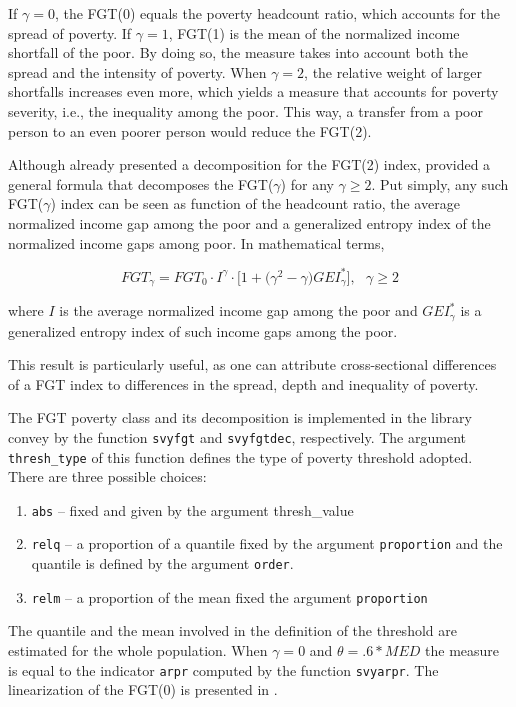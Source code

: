 \documentclass[]{book}
\providecommand{\tightlist}{%
  \setlength{\itemsep}{0pt}\setlength{\parskip}{0pt}}
\begin{document}
If \(\gamma =0\), the FGT(0) equals the poverty headcount ratio, which accounts for the spread of poverty. If \(\gamma =1\), FGT(1) is the mean of the normalized income shortfall of the poor. By doing so, the measure takes into account both the spread and the intensity of poverty. When \(\gamma =2\), the relative weight of larger shortfalls increases even more, which yields a measure that accounts for poverty severity, i.e., the inequality among the poor. This way, a transfer from a poor person to an even poorer person would reduce the FGT(2).

Although \citet{foster1984} already presented a decomposition for the FGT(2) index, \citet{aristondo2010} provided a general formula that decomposes the FGT(\(\gamma\)) for any \(\gamma \geqslant 2\). Put simply, any such FGT(\(\gamma\)) index can be seen as function of the headcount ratio, the average normalized income gap among the poor and a generalized entropy index of the normalized income gaps among poor. In mathematical terms,

\[
FGT_\gamma = FGT_0 \cdot I^\gamma \cdot \big[ 1 + \big( \gamma^2 -\gamma \big) GEI_\gamma^* \big] , \text{ } \gamma \geq 2
\]

where \(I\) is the average normalized income gap among the poor and \(GEI_\gamma^*\) is a generalized entropy index of such income gaps among the poor.

This result is particularly useful, as one can attribute cross-sectional differences of a FGT index to differences in the spread, depth and inequality of poverty.

The FGT poverty class and its decomposition is implemented in the library convey by the function \texttt{svyfgt} and \texttt{svyfgtdec}, respectively.
The argument \texttt{thresh\_type} of this function defines the type of poverty threshold adopted.
There are three possible choices:

\begin{enumerate}
\def\labelenumi{\arabic{enumi}.}
\tightlist
\item
  \texttt{abs} -- fixed and given by the argument thresh\_value
\item
  \texttt{relq} -- a proportion of a quantile fixed by the argument \texttt{proportion} and the quantile is defined by the argument \texttt{order}.
\item
  \texttt{relm} -- a proportion of the mean fixed the argument \texttt{proportion}
\end{enumerate}

The quantile and the mean involved in the definition of the threshold are estimated for the whole population. When \(\gamma=0\) and \(\theta= .6*MED\) the measure is equal to the indicator \texttt{arpr} computed by the function \texttt{svyarpr}. The linearization of the FGT(0) is presented in \citet{berger2003}.
\end{document}
